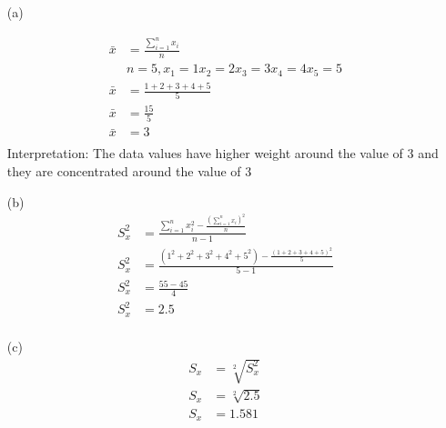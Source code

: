 \documentclass[12pt]{article}
\begin{document}
\begin{enumerate}
    \item[(a)]

        \begin{align*}
            \bar{x} & = \frac{\sum_{i = 1}^{n} x_i}{n}               \\
                    & n = 5, x_1 = 1 x_2 = 2 x_3 = 3 x_4 = 4 x_5 = 5 \\
            \bar{x} & = \frac{1 + 2 + 3 + 4 + 5}{5}                  \\
            \bar{x} & = \frac{15}{5}                                 \\
            \bar{x} & = 3                                            \\
        \end{align*}
        Interpretation: The data values have higher weight around the value of $3$ and they are concentrated around the value of $3$
    \item[(b)]
        \begin{align*}
            S_x^2 & = \frac{\sum_{i = 1}^{n}x_i^2 - \frac{(\sum_{i = 1}^{n}x_i)^2}{n}}{n-1}         \\
            S_x^2 & = \frac{(1^2 + 2^2 + 3^2 + 4^2 + 5^2) - \frac{(1 + 2 + 3 + 4 + 5)^2}{5}}{5 - 1} \\
            S_x^2 & = \frac{55 - 45}{4}                                                             \\
            S_x^2 & = 2.5                                                                           \\
        \end{align*}

    \item[(c)] \begin{align*}
            S_x & = \sqrt[2]{S_x^2} \\
            S_x & = \sqrt[2]{2.5}   \\
            S_x & = 1.581           \\
        \end{align*}



\end{enumerate}
\end{document}
